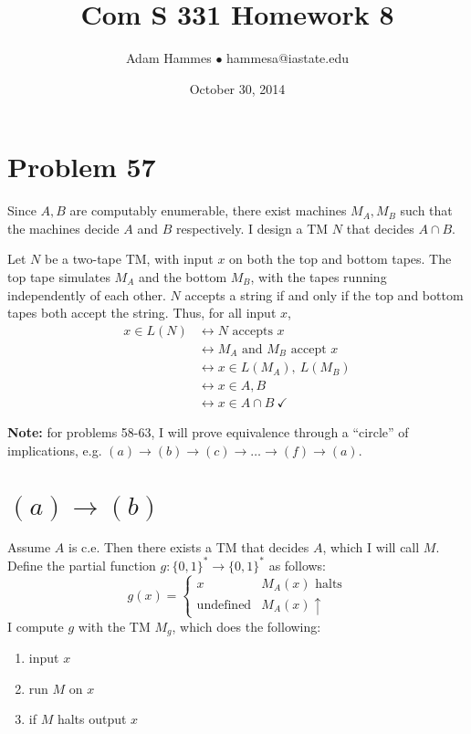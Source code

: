\documentclass[11pt]{article}
\let\iff\leftrightarrow
\let\imp\rightarrow
\begin{document}
\title{Com S 331 Homework 8}
\author{Adam Hammes $\bullet$ hammesa@iastate.edu}
\date{October 30, 2014}
\maketitle

\section*{Problem 57}

Since $A, B$ are computably enumerable, there exist machines $M_A, M_B$ such that the machines decide $A$ and $B$ respectively.
I design a TM $N$ that decides $A \cap B$.

Let $N$ be a two-tape TM, with input $x$ on both the top and bottom tapes. 
The top tape simulates $M_A$ and the bottom $M_B$, with the tapes running independently of each other.
$N$ accepts a string if and only if the top and bottom tapes both accept the string. Thus, for all input $x$,
\begin{align*}
	x \in L(N) &\iff N \text{ accepts } x \\
	&\iff M_A \text{ and } M_B \text{ accept } x \\
	&\iff x \in L(M_A),\ L(M_B) \\
	&\iff x \in A, B \\
	&\iff x \in A \cap B \ \checkmark
\end{align*}


\textbf{Note:} for problems 58-63, I will prove equivalence through a ``circle'' of implications, e.g. $(a) \imp (b) \imp (c) \imp \ldots \imp (f) \imp (a)$.

\section*{$(a) \imp (b)$}

Assume $A$ is c.e.
Then there exists a TM that decides $A$, which I will call $M$.
Define the partial function $g: \{0,1\}^* \imp \{0,1\}^* $ as follows:
\[g(x) =
	\begin{cases}
		x & M_A(x) \text{ halts} \\
		\text{undefined} & M_A(x) \uparrow
	\end{cases}
\]
I compute $g$ with the TM $M_g$, which does the following:
\begin{enumerate}
	\item input $x$
	\item run $M$ on $x$
	\item if $M$ halts output $x$
\end{enumerate}
\end{document}
